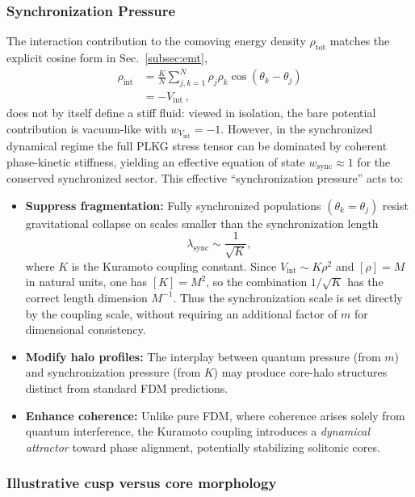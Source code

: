 \subsubsection{Synchronization Pressure}
The interaction contribution to the comoving energy density $\rho_{\mathrm{tot}}$ matches the explicit cosine form in Sec.~\ref{subsec:emt},
\begin{equation}
\begin{aligned}
\rho_{\text{int}}
&= \frac{K}{N}\sum_{j,k=1}^N \rho_j\rho_k\cos(\theta_k-\theta_j) \\
&= -V_{\mathrm{int}}\,,
\end{aligned}
\end{equation}
does not by itself define a stiff fluid: viewed in isolation, the bare potential contribution is vacuum-like with $w_{V_{\text{int}}}=-1$. However, in the synchronized dynamical regime the full PLKG stress tensor can be dominated by coherent phase-kinetic stiffness, yielding an effective equation of state $w_{\text{sync}} \approx 1$ for the conserved synchronized sector. This effective ``synchronization pressure'' acts to:
\begin{itemize}
    \item \textbf{Suppress fragmentation:} Fully synchronized populations $(\theta_k = \theta_j)$ resist gravitational collapse on scales smaller than the synchronization length
    \begin{equation}
    \lambda_{\text{sync}} \sim \frac{1}{\sqrt{K}},
    \label{eq:lambda_sync}
    \end{equation}
    where $K$ is the Kuramoto coupling constant. Since $V_{\text{int}} \sim K\rho^2$ and $[\rho]=M$ in natural units, one has $[K]=M^2$, so the combination $1/\sqrt{K}$ has the correct length dimension $M^{-1}$. Thus the synchronization scale is set directly by the coupling scale, without requiring an additional factor of $m$ for dimensional consistency.
    \item \textbf{Modify halo profiles:} The interplay between quantum pressure (from $m$) and synchronization pressure (from $K$) may produce core-halo structures distinct from standard FDM predictions.
    \item \textbf{Enhance coherence:} Unlike pure FDM, where coherence arises solely from quantum interference, the Kuramoto coupling introduces a \emph{dynamical attractor} toward phase alignment, potentially stabilizing solitonic cores.
\end{itemize}

\subsubsection{Illustrative cusp versus core morphology}
\label{subsubsec:cusp-core-cartoon}


